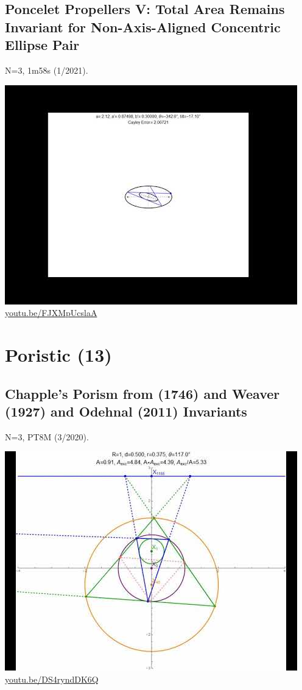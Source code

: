\documentclass[12pt]{amsart}
\begin{document}
\subsection{Poncelet Propellers V: Total Area Remains Invariant for Non-Axis-Aligned Concentric Ellipse Pair}
\label{vid:FJXMpUcslaA}
\noindent N=3, 1m58s (1/2021). 
\begin{center}\includegraphics[width=.5\textwidth]{pics/FJXMpUcslaA.jpg} \\ 
\href{https://youtu.be/FJXMpUcslaA}{\url{youtu.be/FJXMpUcslaA}}\end{center}
% 

\section{Poristic (13)}

\subsection{Chapple's Porism from (1746) and Weaver (1927) and Odehnal (2011) Invariants}
\label{vid:DS4ryndDK6Q}
\noindent N=3, PT8M (3/2020). 
\begin{center}\includegraphics[width=.5\textwidth]{pics/DS4ryndDK6Q.jpg} \\ 
\href{https://youtu.be/DS4ryndDK6Q}{\url{youtu.be/DS4ryndDK6Q}}\end{center}
% 
\end{document}
